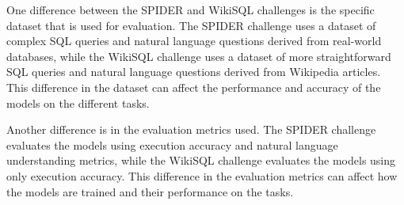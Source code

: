 One difference between the SPIDER and WikiSQL challenges is the specific dataset that is used for evaluation. The SPIDER challenge uses a dataset of complex SQL queries and natural language questions derived from real-world databases, while the WikiSQL challenge uses a dataset of more straightforward SQL queries and natural language questions derived from Wikipedia articles. This difference in the dataset can affect the performance and accuracy of the models on the different tasks.

Another difference is in the evaluation metrics used. The SPIDER challenge evaluates the models using execution accuracy and natural language understanding metrics, while the WikiSQL challenge evaluates the models using only execution accuracy. This difference in the evaluation metrics can affect how the models are trained and their performance on the tasks.
